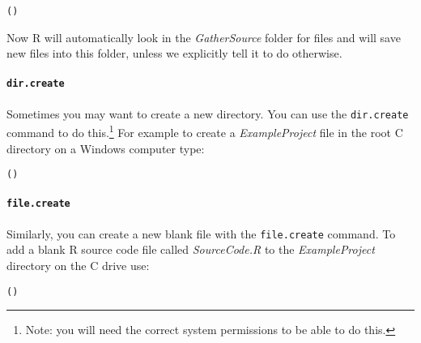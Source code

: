 \begin{knitrout}
\color{fgcolor}\begin{kframe}
\begin{alltt}
()
\end{alltt}
\end{kframe}
\end{knitrout}


\noindent Now R will automatically look in the {\emph{GatherSource}} folder for files and will save new files into this folder, unless we explicitly tell it to do otherwise.

\paragraph{{\tt{dir.create}}}

Sometimes you may want to create a new directory. You can use the {\tt{dir.create}} command to do this.\footnote{Note: you will need the correct system permissions to be able to do this.} For example to create a {\emph{ExampleProject}} file in the root C directory on a Windows computer type:

\begin{knitrout}
\color{fgcolor}\begin{kframe}
\begin{alltt}
()
\end{alltt}
\end{kframe}
\end{knitrout}


\paragraph{{\tt{file.create}}}

Similarly, you can create a new blank file with the \texttt{file.create} command. To add a blank R source code file called {\emph{SourceCode.R}} to the {\emph{ExampleProject}} directory on the C drive use:

\begin{knitrout}
\color{fgcolor}\begin{kframe}
\begin{alltt}
()
\end{alltt}
\end{kframe}
\end{knitrout}


